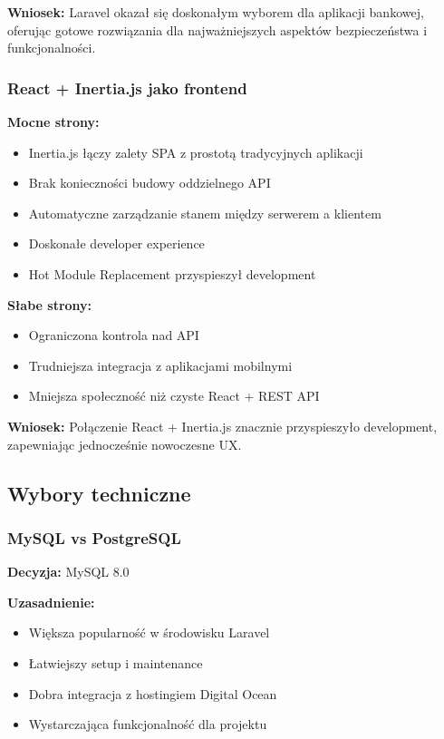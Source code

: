 \documentclass[12pt,a4paper]{article}
\begin{document}
    \textbf{Wniosek:} Laravel okazał się doskonałym wyborem dla aplikacji bankowej, oferując gotowe rozwiązania dla najważniejszych aspektów bezpieczeństwa i funkcjonalności.

    \subsubsection{React + Inertia.js jako frontend}

    \textbf{Mocne strony:}
    \begin{itemize}
        \item Inertia.js łączy zalety SPA z prostotą tradycyjnych aplikacji
        \item Brak konieczności budowy oddzielnego API
        \item Automatyczne zarządzanie stanem między serwerem a klientem
        \item Doskonałe developer experience
        \item Hot Module Replacement przyspieszył development
    \end{itemize}

    \textbf{Słabe strony:}
    \begin{itemize}
        \item Ograniczona kontrola nad API
        \item Trudniejsza integracja z aplikacjami mobilnymi
        \item Mniejsza społeczność niż czyste React + REST API
    \end{itemize}

    \textbf{Wniosek:} Połączenie React + Inertia.js znacznie przyspieszyło development, zapewniając jednocześnie nowoczesne UX.

    \subsection{Wybory techniczne}

    \subsubsection{MySQL vs PostgreSQL}

    \textbf{Decyzja:} MySQL 8.0

    \textbf{Uzasadnienie:}
    \begin{itemize}
        \item Większa popularność w środowisku Laravel
        \item Łatwiejszy setup i maintenance
        \item Dobra integracja z hostingiem Digital Ocean
        \item Wystarczająca funkcjonalność dla projektu
    \end{itemize}
\end{document}
